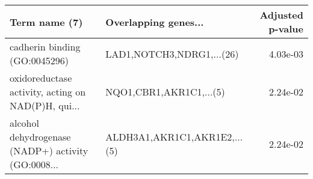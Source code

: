 \begin{tabular}{llr}
\toprule
                                     Term name (7) &         Overlapping genes... &  Adjusted p-value \\
\midrule
                     cadherin binding (GO:0045296) &    LAD1,NOTCH3,NDRG1,...(26) &          4.03e-03 \\
oxidoreductase activity, acting on NAD(P)H, qui... &      NQO1,CBR1,AKR1C1,...(5) &          2.24e-02 \\
alcohol dehydrogenase (NADP+) activity (GO:0008... & ALDH3A1,AKR1C1,AKR1E2,...(5) &          2.24e-02 \\
\bottomrule
\end{tabular}
